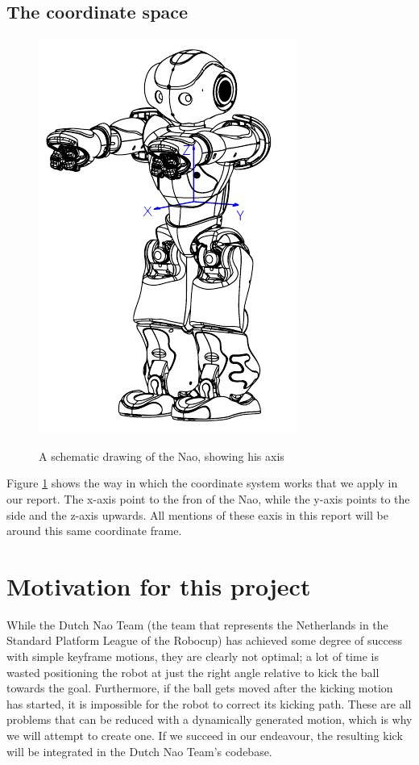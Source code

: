 \documentclass[a4paper]{article}
\begin{document}
\subsection{The coordinate space}
\begin{figure}[htb]
	\centering
	\includegraphics[scale=0.6]{pics/hardware_inertialunit.png}
	\label{fig:hardware}
	\caption{A schematic drawing of the Nao, showing his axis}
\end{figure}

Figure \ref{fig:hardware} shows the way in which the coordinate system works that we
apply in our report. The x-axis point to the fron of the Nao, while the y-axis
points to the side and the z-axis upwards. All mentions of these eaxis in this
report will be around this same coordinate frame.



\section{Motivation for this project} 
While the Dutch Nao Team\cite{DNT2012} (the team that represents the Netherlands
in the Standard Platform League of the Robocup) has achieved some degree of
success with simple keyframe motions, they are clearly not optimal; a lot of
time is wasted positioning the robot at just the right angle relative to kick
the ball towards the goal. Furthermore, if the ball gets moved after the kicking
motion has started, it is impossible for the robot to correct its kicking path. These are all problems that can be reduced with a dynamically generated motion, which is why we will attempt to create one. If we succeed in our endeavour, the resulting kick will be integrated in the Dutch Nao Team's codebase.
\end{document}
